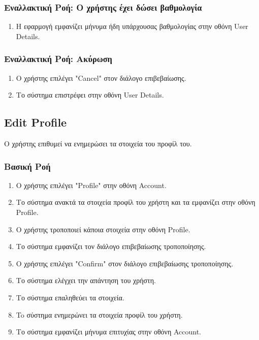 \subsubsection{Εναλλακτική Ροή: Ο χρήστης έχει δώσει βαθμολογία}

\begin{enumerate}
    \item H εφαρμογή εμφανίζει μήνυμα ήδη υπάρχουσας βαθμολογίας στην οθόνη User Details.
\end{enumerate}

\subsubsection{Εναλλακτική Ροή: Ακύρωση}

\begin{enumerate}
    \item Ο χρήστης επιλέγει "Cancel" στον διάλογο επιβεβαίωσης.
    \item Το σύστημα επιστρέφει στην οθόνη User Details.
\end{enumerate}

\subsection{Edit Profile}

Ο χρήστης επιθυμεί να ενημερώσει τα στοιχεία του προφίλ του.

\subsubsection{Βασική Ροή}

\begin{enumerate}
    \item Ο χρήστης επιλέγει "Profile" στην οθόνη Account.
    \item Το σύστημα ανακτά τα στοιχεία προφίλ του χρήστη και τα εμφανίζει στην οθόνη Profile.
    \item Ο χρήστης τροποποιεί κάποια στοιχεία στην οθόνη Profile.
    \item Το σύστημα εμφανίζει τον διάλογο επιβεβαίωσης τροποποίησης.
    \item Ο χρήστης επιλέγει "Confirm" στον διάλογο επιβεβαίωσης τροποποίησης.
    \item Το σύστημα ελέγχει την απάντηση του χρήστη.
    \item Το σύστημα επαληθεύει τα στοιχεία.
    \item To σύστημα ενημερώνει τα στοιχεία προφίλ του χρήστη.
    \item Το σύστημα εμφανίζει μήνυμα επιτυχίας στην οθόνη Account.
\end{enumerate}

